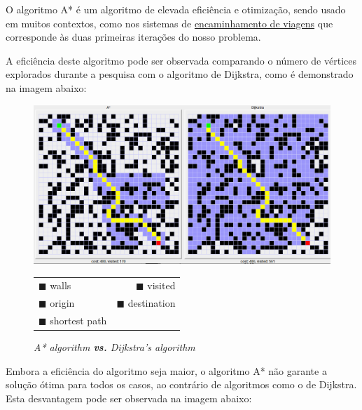 \documentclass[article, a4paper, 12pt, oneside]{memoir}
\begin{document}
O algoritmo A* é um algoritmo de elevada eficiência e otimização, sendo usado em muitos contextos, como nos sistemas de \href{https://en.wikipedia.org/wiki/Journey_planner}{encaminhamento de viagens} que corresponde às duas primeiras iterações do nosso problema.

A eficiência deste algoritmo pode ser observada comparando o número de vértices explorados durante a pesquisa com o algoritmo de Dijkstra, como é demonstrado na imagem abaixo:

\begin{figure}[h]
\centering
\includegraphics[scale=0.4]{pathfinder}
\caption{\emph{A* algorithm \textbf{vs.} Dijkstra's algorithm}}
\begin{tabular}{ l r }
\color{black} $\blacksquare$ \color{black} walls & \color{Periwinkle} $\blacksquare$ \color{black} visited \\
\color{green} $\blacksquare$ \color{black} origin & \color{red} $\blacksquare$ \color{black} destination \\
\color{yellow} $\blacksquare$ \color{black} shortest path
\end{tabular}
\end{figure}

Embora a eficiência do algoritmo seja maior, o algoritmo A* não garante a solução ótima para todos os casos, ao contrário de algoritmos como o de Dijkstra. Esta desvantagem pode ser observada na imagem abaixo:
\end{document}
